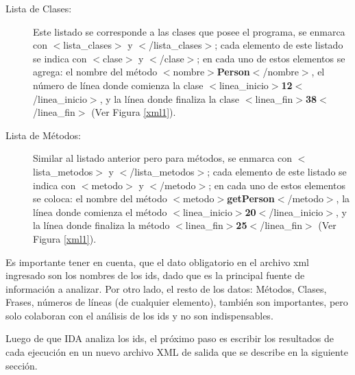\begin{appendices}
\begin{description}
\item[Lista de Clases:] Este listado se corresponde a las clases que posee el programa, se enmarca con \mbox{$<$\textsf{lista\_clases}$>$} y \mbox{$<$/\textsf{lista\_clases}$>$}; cada elemento de este listado se indica con $<$\textsf{clase}$>$ y $<$/\textsf{clase}$>$; en cada uno de estos elementos se agrega: el nombre del método  \mbox{$<$\textsf{nombre}$>$\textbf{Person}$<$/\textsf{nombre}$>$}, el número de línea donde comienza la clase \mbox{$<$\textsf{linea\_inicio}$>$\textbf{12}$<$/\textsf{linea\_inicio}$>$}, y la línea donde finaliza la clase \mbox{$<$\textsf{linea\_fin}$>$\textbf{38}$<$/\textsf{linea\_fin}$>$} (Ver Figura \ref{xml1}). 

\item[Lista de Métodos:] Similar al listado anterior pero para métodos, se enmarca con \mbox{$<$\textsf{lista\_metodos}$>$} y \mbox{$<$/\textsf{lista\_metodos}$>$}; cada elemento de este listado se indica con $<$\textsf{metodo}$>$ y $<$/\textsf{metodo}$>$; en cada uno de estos elementos se coloca: el nombre del método \mbox{$<$\textsf{metodo}$>$\textbf{getPerson}$<$/\textsf{metodo}$>$}, la línea donde comienza el método \mbox{$<$\textsf{linea\_inicio}$>$\textbf{20}$<$/\textsf{linea\_inicio}$>$}, y la línea donde finaliza la método \mbox{$<$\textsf{linea\_fin}$>$\textbf{25}$<$/\textsf{linea\_fin}$>$} (Ver Figura \ref{xml1}).

\end{description}

Es importante tener en cuenta, que el dato obligatorio en el archivo xml ingresado son los nombres de los ids, dado que es la principal fuente de información a analizar. Por otro lado, el resto de los datos: Métodos, Clases, Frases, números de líneas (de cualquier elemento), también son importantes, pero solo colaboran con el análisis de los ids y no son indispensables.
 
Luego de que IDA analiza los ids, el próximo paso es escribir los resultados de cada ejecución en un nuevo archivo XML de salida que se describe en la siguiente sección.





\end{appendices}
